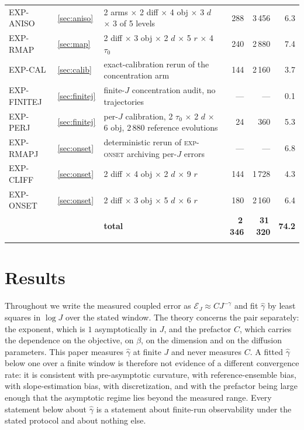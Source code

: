 \documentclass[pdflatex,sn-mathphys-num]{sn-jnl}
\theoremstyle{thmstyleone}
\theoremstyle{thmstyletwo}
\theoremstyle{thmstylethree}
\begin{document}
\begin{table}[h]
\begin{tabular}{@{}llp{4.8cm}rrr@{}}
EXP-ANISO & \ref{sec:aniso} & 2 arms $\times$ 2 diff $\times$ 4 obj $\times$ 3 $d$ $\times$ 3 of 5 levels & 288 & 3\,456 & 6.3\\
EXP-RMAP & \ref{sec:map} & 2 diff $\times$ 3 obj $\times$ 2 $d$ $\times$ 5 $r$ $\times$ 4 $\tau_0$ & 240 & 2\,880 & 7.4\\
EXP-CAL & \ref{sec:calib} & exact-calibration rerun of the concentration arm & 144 & 2\,160 & 3.7\\
EXP-FINITEJ & \ref{sec:finitej} & finite-$J$ concentration audit, no trajectories & --- & --- & 0.1\\
EXP-PERJ & \ref{sec:finitej} & per-$J$ calibration, 2 $\tau_0$ $\times$ 2 $d$ $\times$ 6 obj, 2\,880 reference evolutions & 24 & 360 & 5.3\\
EXP-RMAPJ & \ref{sec:onset} & deterministic rerun of \textsc{exp-onset} archiving per-$J$ errors & --- & --- & 6.8\\

EXP-CLIFF & \ref{sec:onset} & 2 diff $\times$ 4 obj $\times$ 2 $d$ $\times$ 9 $r$ & 144 & 1\,728 & 4.3\\
EXP-ONSET & \ref{sec:onset} & 2 diff $\times$ 3 obj $\times$ 5 $d$ $\times$ 6 $r$ & 180 & 2\,160 & 6.4\\
\midrule
& & \textbf{total} & \textbf{2\,346} & \textbf{31\,320} & \textbf{74.2}\\
\botrule
\end{tabular}\normalsize
\end{table}

\section{Results}\label{sec7}

Throughout we write the measured coupled error as $\mathcal E_J\approx CJ^{-\gamma}$ and fit $\hat\gamma$ by least squares in $\log J$ over the stated window. The theory concerns the pair separately: the exponent, which is $1$ asymptotically in $J$, and the prefactor $C$, which carries the dependence on the objective, on $\beta$, on the dimension and on the diffusion parameters. This paper measures $\hat\gamma$ at finite $J$ and never measures $C$. A fitted $\hat\gamma$ below one over a finite window is therefore not evidence of a different convergence rate: it is consistent with pre-asymptotic curvature, with reference-ensemble bias, with slope-estimation bias, with discretization, and with the prefactor being large enough that the asymptotic regime lies beyond the measured range. Every statement below about $\hat\gamma$ is a statement about finite-run observability under the stated protocol and about nothing else.
\end{document}
